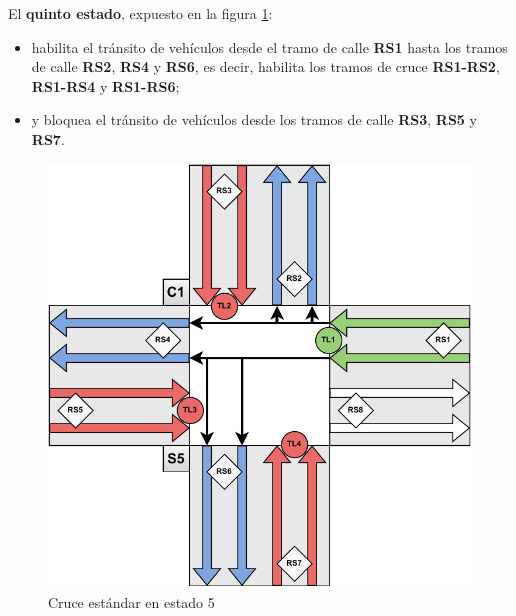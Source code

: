 \newpage
El \textbf{quinto estado}, expuesto en la figura \ref{fig:cruce_estandar_estado_5}:
\begin{itemize}
    \item habilita el tránsito de vehículos desde el tramo de calle \textbf{RS1} hasta los tramos de calle \textbf{RS2}, \textbf{RS4} y \textbf{RS6}, es decir, habilita los tramos de cruce \textbf{RS1-RS2}, \textbf{RS1-RS4} y \textbf{RS1-RS6};
    \item y bloquea el tránsito de vehículos desde los tramos de calle \textbf{RS3}, \textbf{RS5} y \textbf{RS7}.
\end{itemize}
\begin{figure}[H]
    \centering
    \includegraphics[width=1\linewidth]{text/image/DCruc-CE-Estado5.pdf}
    \caption{Cruce estándar en estado 5}
    \label{fig:cruce_estandar_estado_5}
\end{figure}

